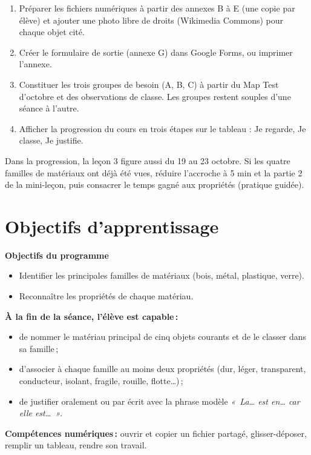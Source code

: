 \documentclass[11pt,a4paper]{article}
\begin{document}
\begin{astuce}
\begin{enumerate}
 \item Préparer les fichiers numériques à partir des annexes B à E (une copie par élève) et ajouter une photo libre de droits (Wikimedia Commons) pour chaque objet cité.
 \item Créer le formulaire de sortie (annexe G) dans Google Forms, ou imprimer l'annexe.
 \item Constituer les trois groupes de besoin (A, B, C) à partir du Map Test d'octobre et des observations de classe. Les groupes restent souples d'une séance à l'autre.
 \item Afficher la progression du cours en trois étapes sur le tableau : Je regarde, Je classe, Je justifie.
\end{enumerate}
\end{astuce}

\begin{astuce}
Dans la progression, la leçon 3 figure aussi du 19 au 23 octobre. Si les quatre familles de matériaux ont déjà été vues, réduire l'accroche à 5 min et la partie 2 de la mini-leçon, puis consacrer le temps gagné aux propriétés (pratique guidée).
\end{astuce}

\section{Objectifs d'apprentissage}
\begin{tcolorbox}[colback=gray!8,colframe=gray!60!black,arc=1mm,boxrule=0.5pt]
\textbf{Objectifs du programme}
\begin{itemize}
 \item Identifier les principales familles de matériaux (bois, métal, plastique, verre).
 \item Reconnaître les propriétés de chaque matériau.
\end{itemize}
\textbf{À la fin de la séance, l'élève est capable\,:}
\begin{itemize}
 \item de nommer le matériau principal de cinq objets courants et de le classer dans sa famille\,;
 \item d'associer à chaque famille au moins deux propriétés (dur, léger, transparent, conducteur, isolant, fragile, rouille, flotte\ldots)\,;
 \item de justifier oralement ou par écrit avec la phrase modèle \textit{«~La\ldots{} est en\ldots{} car elle est\ldots~»}.
\end{itemize}
\textbf{Compétences numériques\,:} ouvrir et copier un fichier partagé, glisser-déposer, remplir un tableau, rendre son travail.
\end{tcolorbox}
\end{document}
